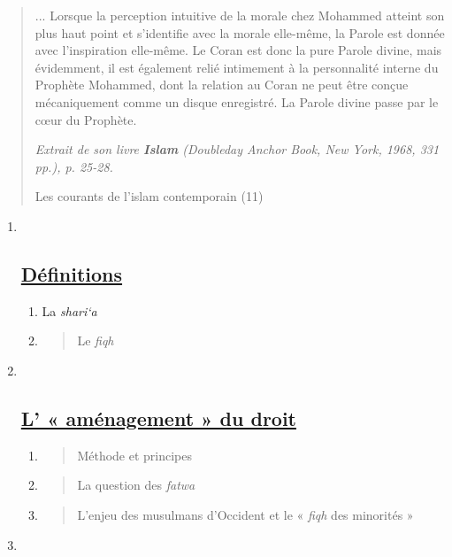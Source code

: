 \begin{quote}
... Lorsque la perception intuitive de la morale chez Mohammed atteint
son plus haut point et s'identifie avec la morale elle-même, la Parole
est donnée avec l'inspiration elle-même. Le Coran est donc la pure
Parole divine, mais évidemment, il est également relié intimement à la
personnalité interne du Prophète Mohammed, dont la relation au Coran ne
peut être conçue mécaniquement comme un disque enregistré. La Parole
divine passe par le cœur du Prophète.

\emph{Extrait de son livre \textbf{Islam} (Doubleday Anchor Book, New
York, 1968, 331 pp.), p. 25-28.}

Les courants de l'islam contemporain (11)
\end{quote}

\begin{enumerate}
\def\labelenumi{\Roman{enumi}.}
\item ~
  \hypertarget{duxe9finitions}{%
  \subsection{\texorpdfstring{
  \underline{Définitions}}{ Définitions}}\label{duxe9finitions}}

  \begin{enumerate}
  \def\labelenumii{\arabic{enumii}.}
  \item
    La \emph{shari`a}
  \item
    \begin{quote}
    Le \emph{fiqh}
    \end{quote}
  \end{enumerate}
\item ~
  \hypertarget{l-amuxe9nagement-du-droit}{%
  \subsection{\texorpdfstring{\underline{L' « aménagement » du
  droit}}{L' « aménagement » du droit}}\label{l-amuxe9nagement-du-droit}}

  \begin{enumerate}
  \def\labelenumii{\arabic{enumii}.}
  \item
    \begin{quote}
    Méthode et principes
    \end{quote}
  \item
    \begin{quote}
    La question des \emph{fatwa}
    \end{quote}
  \item
    \begin{quote}
    L'enjeu des musulmans d'Occident et le « \emph{fiqh} des minorités »
    \end{quote}
  \end{enumerate}
\item ~
  \hypertarget{repenser-la-norme}{%
}
\end{enumerate}
